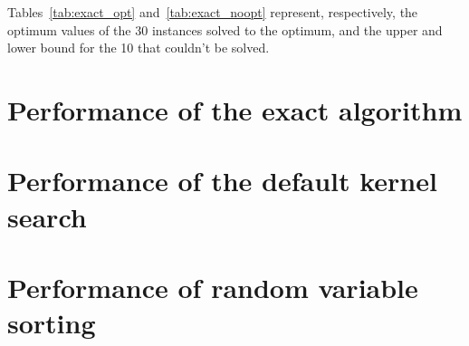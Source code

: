 Tables~\ref{tab:exact_opt} and~\ref{tab:exact_noopt} represent,
respectively, the optimum values of the 30 instances solved to
the optimum, and the upper and lower bound for the 10
that couldn't be solved.





\section{Performance of the exact algorithm}


\section{Performance of the default kernel search}


\section{Performance of random variable sorting}
